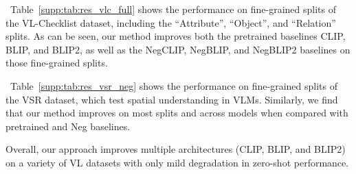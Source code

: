 \documentclass[11pt]{article}
\newcommand{\tabref}[1]{Table~\ref{#1}}
\begin{document}
~\tabref{supp:tab:res_vlc_full} shows the performance on fine-grained splits of the VL-Checklist dataset, including the ``Attribute'', ``Object'', and ``Relation'' splits. As can be seen, our method improves both the pretrained baselines CLIP, BLIP, and BLIP2, as well as the NegCLIP, NegBLIP, and NegBLIP2 baselines on those fine-grained splits. 


~\tabref{supp:tab:res_vsr_neg} shows the performance on fine-grained splits of the VSR dataset, which test spatial understanding in VLMs. Similarly, we find that our method improves on most splits and across models when compared with pretrained and Neg baselines.

Overall, our approach improves multiple architectures (CLIP, BLIP, and BLIP2) on a variety of VL datasets with only mild degradation in zero-shot performance.
\end{document}
